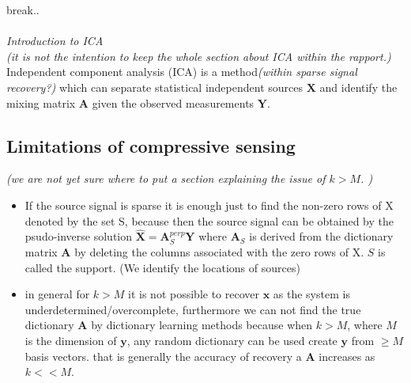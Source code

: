 break.. \\ \\
\textit{Introduction to ICA}\\
\textit{(it is not the intention to keep the whole section about ICA within the rapport.)}
Independent component analysis (ICA) is a method\textit{(within sparse signal recovery?)} which can separate statistical independent sources $\textbf{X}$ and identify the mixing matrix $\textbf{A}$ given the observed measurements $\textbf{Y}$. 




\subsection{Limitations of compressive sensing}
\textit{(we are not yet sure where to put a section explaining the issue of $k>M$. )}
\begin{itemize}
\item If the source signal is sparse it is enough just to find the non-zero rows of X denoted by the set S, because then the source signal can be obtained by the psudo-inverse solution $\hat{\mathbf{X}} = \mathbf{A}_S^{perp} \mathbf{Y}$ where $\mathbf{A}_S$ is derived from the dictionary matrix $\mathbf{A}$ by deleting the columns associated with the zero rows of X. $S$ is called the support. (We identify the locations of sources)
\item in general for $k>M$ it is not possible to recover $\textbf{x}$ as the system is underdetermined/overcomplete, furthermore we can not find the true dictionary $\textbf{A}$ by dictionary learning methods because when $k>M$, where $M$ is the dimension of $\textbf{y}$, any random dictionary can be used create $\textbf{y}$ from $\geq M$ basis vectors. that is generally the accuracy of recovery a $\textbf{A}$ increases as $k<<M$.\\
\end{itemize}


